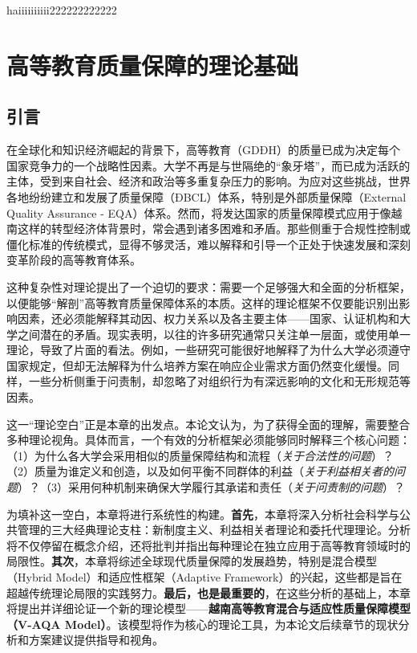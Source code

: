 haiiiiiiiiii222222222222


\chapter{高等教育质量保障的理论基础}
\label{chap:ly_luan}

\section*{引言}

在全球化和知识经济崛起的背景下，高等教育（GDĐH）的质量已成为决定每个国家竞争力的一个战略性因素。大学不再是与世隔绝的“象牙塔”，而已成为活跃的主体，受到来自社会、经济和政治等多重复杂压力的影响。为应对这些挑战，世界各地纷纷建立和发展了质量保障（ĐBCL）体系，特别是外部质量保障（External Quality Assurance - EQA）体系。然而，将发达国家的质量保障模式应用于像越南这样的转型经济体背景时，常会遇到诸多困难和矛盾。那些侧重于合规性控制或僵化标准的传统模式，显得不够灵活，难以解释和引导一个正处于快速发展和深刻变革阶段的高等教育体系。

这种复杂性对理论提出了一个迫切的要求：需要一个足够强大和全面的分析框架，以便能够“解剖”高等教育质量保障体系的本质。这样的理论框架不仅要能识别出影响因素，还必须能解释其动因、权力关系以及各主要主体——国家、认证机构和大学之间潜在的矛盾。现实表明，以往的许多研究通常只关注单一层面，或使用单一理论，导致了片面的看法。例如，一些研究可能很好地解释了为什么大学必须遵守国家规定，但却无法解释为什么培养方案在响应企业需求方面仍然变化缓慢。同样，一些分析侧重于问责制，却忽略了对组织行为有深远影响的文化和无形规范等因素。

这一“理论空白”正是本章的出发点。本论文认为，为了获得全面的理解，需要整合多种理论视角。具体而言，一个有效的分析框架必须能够同时解释三个核心问题：（1）为什么各大学会采用相似的质量保障结构和流程（\textit{关于合法性的问题}）？（2）质量为谁定义和创造，以及如何平衡不同群体的利益（\textit{关于利益相关者的问题}）？（3）采用何种机制来确保大学履行其承诺和责任（\textit{关于问责制的问题}）？

为填补这一空白，本章将进行系统性的构建。\textbf{首先}，本章将深入分析社会科学与公共管理的三大经典理论支柱：新制度主义、利益相关者理论和委托代理理论。分析将不仅停留在概念介绍，还将批判并指出每种理论在独立应用于高等教育领域时的局限性。\textbf{其次}，本章将综述全球现代质量保障的发展趋势，特别是混合模型（Hybrid Model）和适应性框架（Adaptive Framework）的兴起，这些都是旨在超越传统理论局限的实践努力。\textbf{最后，也是最重要的}，在这些分析的基础上，本章将提出并详细论证一个新的理论模型——\textbf{越南高等教育混合与适应性质量保障模型（V-AQA Model）}。该模型将作为核心的理论工具，为本论文后续章节的现状分析和方案建议提供指导和视角。



